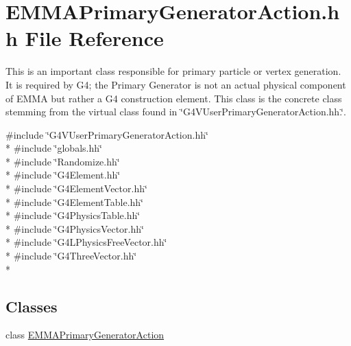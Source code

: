 \hypertarget{EMMAPrimaryGeneratorAction_8hh}{\section{E\-M\-M\-A\-Primary\-Generator\-Action.\-hh File Reference}
\label{EMMAPrimaryGeneratorAction_8hh}
}


This is an important class responsible for primary particle or vertex generation. It is required by G4; the Primary Generator is not an actual physical component of E\-M\-M\-A but rather a G4 construction element. This class is the concrete class stemming from the virtual class found in \char`\"{}\-G4\-V\-User\-Primary\-Generator\-Action.\-hh.\char`\"{}.  


{\ttfamily \#include \char`\"{}G4\-V\-User\-Primary\-Generator\-Action.\-hh\char`\"{}}\\*
{\ttfamily \#include \char`\"{}globals.\-hh\char`\"{}}\\*
{\ttfamily \#include \char`\"{}Randomize.\-hh\char`\"{}}\\*
{\ttfamily \#include \char`\"{}G4\-Element.\-hh\char`\"{}}\\*
{\ttfamily \#include \char`\"{}G4\-Element\-Vector.\-hh\char`\"{}}\\*
{\ttfamily \#include \char`\"{}G4\-Element\-Table.\-hh\char`\"{}}\\*
{\ttfamily \#include \char`\"{}G4\-Physics\-Table.\-hh\char`\"{}}\\*
{\ttfamily \#include \char`\"{}G4\-Physics\-Vector.\-hh\char`\"{}}\\*
{\ttfamily \#include \char`\"{}G4\-L\-Physics\-Free\-Vector.\-hh\char`\"{}}\\*
{\ttfamily \#include \char`\"{}G4\-Three\-Vector.\-hh\char`\"{}}\\*
\subsection*{Classes}
\begin{DoxyCompactItemize}
\item 
class \hyperlink{classEMMAPrimaryGeneratorAction}{E\-M\-M\-A\-Primary\-Generator\-Action}
\end{DoxyCompactItemize}
